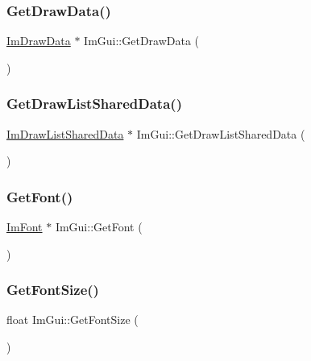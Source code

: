 \hypertarget{namespace_im_gui_ab73131dc44b1267dac04f0c2bb0af983}{}\label{namespace_im_gui_ab73131dc44b1267dac04f0c2bb0af983} 
\subsubsection{\texorpdfstring{Get\+Draw\+Data()}{GetDrawData()}}
{\footnotesize\ttfamily \hyperlink{struct_im_draw_data}{Im\+Draw\+Data} $\ast$ Im\+Gui\+::\+Get\+Draw\+Data (\begin{DoxyParamCaption}{ }\end{DoxyParamCaption})}

\hypertarget{namespace_im_gui_a2a5a77bd5b6215e8cb47a8a457224a52}{}\label{namespace_im_gui_a2a5a77bd5b6215e8cb47a8a457224a52} 
\subsubsection{\texorpdfstring{Get\+Draw\+List\+Shared\+Data()}{GetDrawListSharedData()}}
{\footnotesize\ttfamily \hyperlink{struct_im_draw_list_shared_data}{Im\+Draw\+List\+Shared\+Data} $\ast$ Im\+Gui\+::\+Get\+Draw\+List\+Shared\+Data (\begin{DoxyParamCaption}{ }\end{DoxyParamCaption})}

\hypertarget{namespace_im_gui_a43cf349576e20fac4a1300269320ad8f}{}\label{namespace_im_gui_a43cf349576e20fac4a1300269320ad8f} 
\subsubsection{\texorpdfstring{Get\+Font()}{GetFont()}}
{\footnotesize\ttfamily \hyperlink{struct_im_font}{Im\+Font} $\ast$ Im\+Gui\+::\+Get\+Font (\begin{DoxyParamCaption}{ }\end{DoxyParamCaption})}

\hypertarget{namespace_im_gui_ac592ae8e0aa4a1a06502ec7872bc8da8}{}\label{namespace_im_gui_ac592ae8e0aa4a1a06502ec7872bc8da8} 
\subsubsection{\texorpdfstring{Get\+Font\+Size()}{GetFontSize()}}
{\footnotesize\ttfamily float Im\+Gui\+::\+Get\+Font\+Size (\begin{DoxyParamCaption}{ }\end{DoxyParamCaption})}

